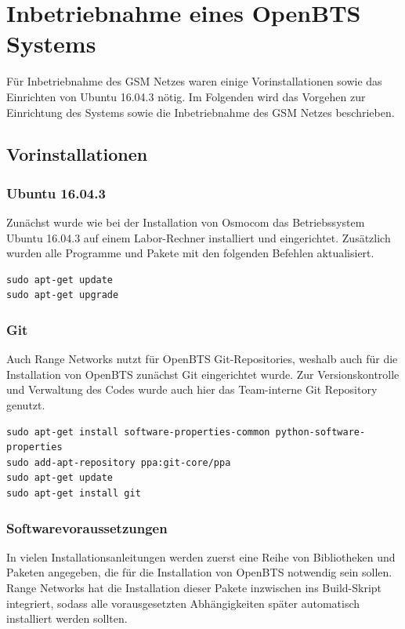 
\section{Inbetriebnahme eines OpenBTS Systems}
Für Inbetriebnahme des GSM Netzes waren einige Vorinstallationen sowie das Einrichten von Ubuntu 16.04.3 nötig. Im Folgenden wird das Vorgehen zur Einrichtung des Systems sowie die Inbetriebnahme des GSM Netzes beschrieben.

\subsection{Vorinstallationen}

\subsubsection{Ubuntu 16.04.3}
Zunächst wurde wie bei der Installation von Osmocom das Betriebssystem Ubuntu 16.04.3 auf einem Labor-Rechner installiert und eingerichtet. Zusätzlich wurden alle Programme und Pakete mit den folgenden Befehlen aktualisiert.
\begin{lstlisting}
sudo apt-get update
sudo apt-get upgrade
\end{lstlisting}

\subsubsection{Git}
Auch Range Networks nutzt für OpenBTS Git-Repositories, weshalb auch für die Installation von OpenBTS zunächst Git eingerichtet wurde. Zur Versionskontrolle und Verwaltung des Codes wurde auch hier das Team-interne Git Repository genutzt.
\begin{lstlisting}
sudo apt-get install software-properties-common python-software-properties
sudo add-apt-repository ppa:git-core/ppa
sudo apt-get update
sudo apt-get install git
\end{lstlisting}

\subsubsection{Softwarevoraussetzungen}
In vielen Installationsanleitungen werden zuerst eine Reihe von Bibliotheken und Paketen angegeben, die für die Installation von OpenBTS notwendig sein sollen. Range Networks hat die Installation dieser Pakete inzwischen ins Build-Skript integriert, sodass alle vorausgesetzten Abhängigkeiten später automatisch installiert werden sollten.

